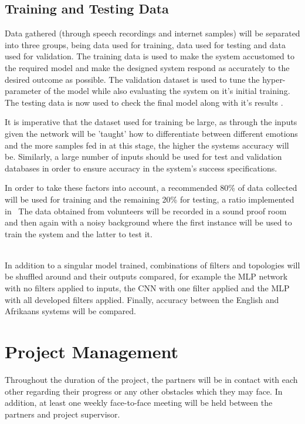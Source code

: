 \documentclass[10pt,twocolumn]{witseiepaper}
\begin{document}
\subsection{Training and Testing Data}\label{sec:traintest}
Data gathered (through speech recordings and internet samples) will be separated into three groups, being data used for training, data used for testing and data used for validation. The training data is used to make the system accustomed to the required model and make the designed system respond as accurately to the desired outcome as possible. The validation dataset is used to tune the hyper-parameter of the model while also evaluating the system on it's initial training. The testing data is now used to check the final model along with it's results \cite{train}.

It is imperative that the dataset used for training be large, as through the inputs given the network will be 'taught' how to differentiate between different emotions and the more samples fed in at this stage, the higher the systems accuracy will be. Similarly, a large number of inputs should be used for test and validation databases in order to ensure accuracy in the system's success specifications.

In order to take these factors into account, a recommended 80\%  of data collected will be used for training and the remaining 20\% for testing, a ratio implemented in~\cite{RGB}
The data obtained from volunteers will be recorded in a sound proof room and then again with a noisy background where the first instance will be used to train the system and the latter to test it.

\hfill\\
In addition to a singular model trained, combinations of filters and topologies will be shuffled around and their outputs compared, for example the MLP network with no filters applied to inputs, the CNN with one filter applied and the MLP with all developed filters applied. Finally, accuracy between the English and Afrikaans systems will be compared.

\section{Project Management}\label{sec:management}
Throughout the duration of the project, the partners will be in contact with each other regarding their progress or any other obstacles which they may face. In addition, at least one weekly face-to-face meeting will be held between the partners and project supervisor.
\end{document}
